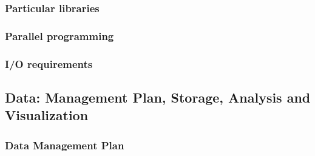 \documentclass[a4paper,12pt]{article}
\newif\ifshowinstructions
\newcommand{\instructions}[1]{\ifshowinstructions {\fontsize{10}{11}\selectfont #1} \fi}
\begin{document}
\instructions{\it

  Please describe all codes you are using in the proposal.
  Justify your choices and describe alternatives (if any).

}

\subsubsection{Particular libraries}

\instructions{\it

  Describe particular libraries required by the production and analysis software, algorithms and numerical techniques employed (e.g., finite element, iterative solver), programming languages.
  Please specify requirements for compilation or build environment (build system (e.g., cmake, python version), version
  control system (e.g., git, subversion) etc.).
  
}

\subsubsection{Parallel programming}

\instructions{\it

  Model(s) used (e.g., MPI, OpenMP/Pthreads, CUDA, OpenACC, etc.).

}

\subsubsection{I/O requirements}

\instructions{\it

  I/O requirements (e.g., amount, size, bandwidth, etc.) for execution, input files, restart and other output.
  Describe I/O strategy (number of files, frequency, read/write size) and I/O behaviour of your code during the period of calculations. 
  Please specify the restart overhead, not only for I/O; (e.g., a code may have to perform a costly domain decomposition first).

}

\subsection{Data: Management Plan, Storage, Analysis and Visualization \instructions{(about 1 page)}}
\vspace{-0.2cm}
\subsubsection{Data Management Plan}
\end{document}
